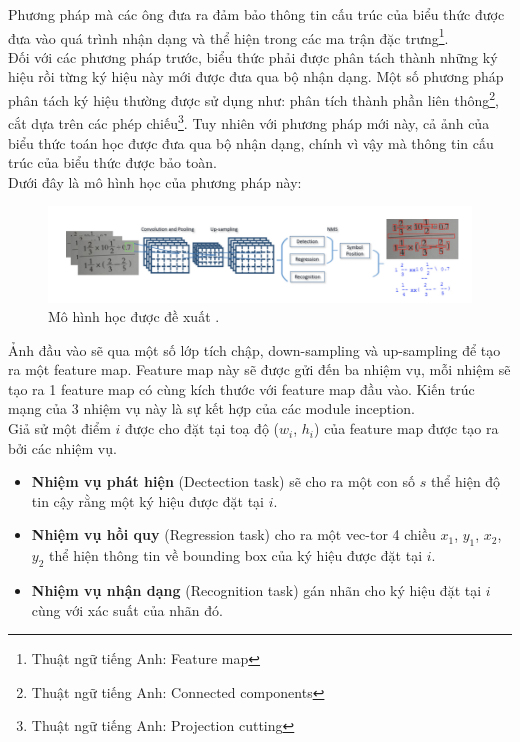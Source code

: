 \documentclass[a4paper,12pt]{article}
\begin{document}
	Phương pháp mà các ông đưa ra đảm bảo thông tin cấu trúc của biểu thức được đưa vào quá trình nhận dạng và thể hiện trong các ma trận đặc trưng\footnote{Thuật ngữ tiếng Anh: Feature map}\cite{yanlecun}. \\
	Đối với các phương pháp trước, biểu thức phải được phân tách thành những ký hiệu rồi từng ký hiệu này mới được đưa qua bộ nhận dạng. Một số phương pháp phân tách ký hiệu thường được sử dụng như: phân tích thành phần liên thông\footnote{Thuật ngữ tiếng Anh: Connected components}, cắt dựa trên các phép chiếu\footnote{Thuật ngữ tiếng Anh: Projection cutting}\cite{segment}. Tuy nhiên với phương pháp mới này, cả ảnh của biểu thức toán học được đưa qua bộ nhận dạng, chính vì vậy mà thông tin cấu trúc của biểu thức được bảo toàn. \\
	
	Dưới đây là mô hình học của phương pháp này:\\
	
	\begin{figure}[!h]
		\centering
		\includegraphics[width=0.9\linewidth]{context_aware.png}
		\vspace{0.2cm}
		\caption{Mô hình học được đề xuất \cite{context}.}
		
	\end{figure}
	
	Ảnh đầu vào sẽ qua một số lớp tích chập, down-sampling và up-sampling để tạo ra một feature map. Feature map này sẽ được gửi đến ba nhiệm vụ, mỗi nhiệm sẽ tạo ra 1 feature map có cùng kích thước với feature map đầu vào. Kiến trúc mạng của 3 nhiệm vụ này là sự kết hợp của các module inception\cite{context}. \\
	Giả sử một điểm $i$ được cho đặt tại toạ độ ($w_i$, $h_i$) của feature map được tạo ra bởi các nhiệm vụ. 
	\begin{itemize}
		\item \textbf{Nhiệm vụ phát hiện} (Dectection task) sẽ cho ra một con số $s$ thể hiện độ tin cậy rằng một ký hiệu được đặt tại $i$.
		\item \textbf{Nhiệm vụ hồi quy} (Regression task) cho ra một vec-tor 4 chiều {$x_1$, $y_1$, $x_2$, $y_2$} thể hiện thông tin về bounding box của ký hiệu được đặt tại $i$.
		\item\textbf{Nhiệm vụ nhận dạng} (Recognition task) gán nhãn cho ký hiệu đặt tại $i$ cùng với xác suất của nhãn đó. 
	\end{itemize}
	
\end{document}
